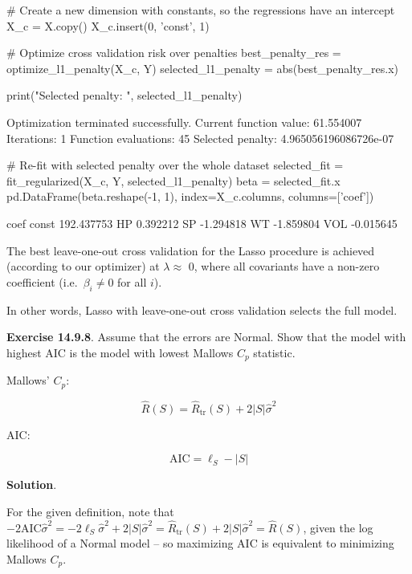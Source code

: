 \begin{python}
# Create a new dimension with constants, so the regressions have an intercept
X_c = X.copy()
X_c.insert(0, 'const', 1)
\end{python}

\begin{python}
# Optimize cross validation risk over penalties
best_penalty_res = optimize_l1_penalty(X_c, Y)
selected_l1_penalty = abs(best_penalty_res.x)

print("Selected penalty: ", selected_l1_penalty)
\end{python}

\begin{console}
Optimization terminated successfully.
         Current function value: 61.554007
         Iterations: 1
         Function evaluations: 45
Selected penalty:  4.965056196086726e-07
\end{console}

\begin{python}
# Re-fit with selected penalty over the whole dataset
selected_fit = fit_regularized(X_c, Y, selected_l1_penalty)
beta = selected_fit.x
pd.DataFrame(beta.reshape(-1, 1), index=X_c.columns, columns=['coef'])
\end{python}

\begin{console}
             coef
const  192.437753
HP       0.392212
SP      -1.294818
WT      -1.859804
VOL     -0.015645
\end{console}

The best leave-one-out cross validation for the Lasso procedure is
achieved (according to our optimizer) at \(\lambda \approx\) 0, where
all covariants have a non-zero coefficient (i.e.~\(\beta_i \neq 0\) for
all \(i\)).

In other words, Lasso with leave-one-out cross validation selects the
full model.

\textbf{Exercise 14.9.8}. Assume that the errors are Normal. Show that
the model with highest AIC is the model with lowest Mallows \(C_p\)
statistic.

Mallows' \(C_p\):

\[\hat{R}(S) = \hat{R}_\text{tr}(S) + 2 |S| \hat{\sigma}^2\]

AIC:

\[  \text{AIC} = \ell_S - |S|\]

\textbf{Solution}.

For the given definition, note that
\(-2 \text{AIC} \hat{\sigma}^2 = -2 \ell_S \hat{\sigma}^2 + 2|S| \hat{\sigma}^2 = \hat{R}_\text{tr}(S) + 2 |S| \hat{\sigma}^2 = \hat{R}(S)\),
given the log likelihood of a Normal model -- so maximizing AIC is
equivalent to minimizing Mallows \(C_p\).

